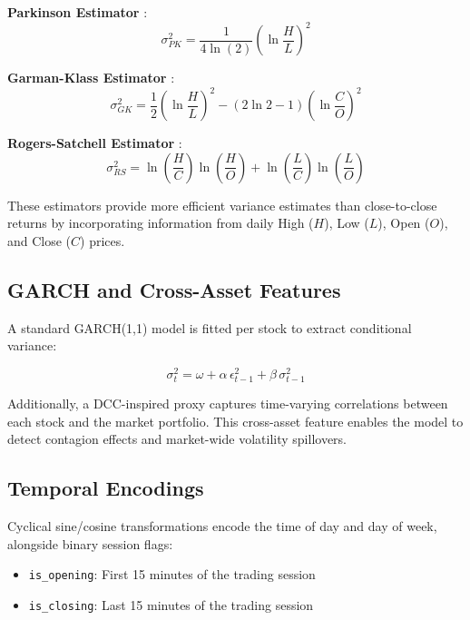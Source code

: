 \textbf{Parkinson Estimator} \cite{parkinson1980}:
\begin{equation}
\sigma_{PK}^2 = \frac{1}{4\ln(2)} \left( \ln\frac{H}{L} \right)^2
\end{equation}

\textbf{Garman-Klass Estimator} \cite{garman1980}:
\begin{equation}
\sigma_{GK}^2 = \frac{1}{2} \left( \ln\frac{H}{L} \right)^2 - (2\ln 2 - 1) \left( \ln\frac{C}{O} \right)^2
\end{equation}

\textbf{Rogers-Satchell Estimator} \cite{rogers1991}:
\begin{equation}
\sigma_{RS}^2 = \ln\!\left(\frac{H}{C}\right) \ln\!\left(\frac{H}{O}\right) + \ln\!\left(\frac{L}{C}\right) \ln\!\left(\frac{L}{O}\right)
\end{equation}

These estimators provide more efficient variance estimates than close-to-close returns by incorporating information from daily High ($H$), Low ($L$), Open ($O$), and Close ($C$) prices.

\subsection{GARCH and Cross-Asset Features}

A standard GARCH(1,1) model \cite{bollerslev1986} is fitted per stock to extract conditional variance:

\begin{equation}
\sigma_t^2 = \omega + \alpha\, \epsilon_{t-1}^2 + \beta\, \sigma_{t-1}^2
\end{equation}

Additionally, a DCC-inspired proxy captures time-varying correlations between each stock and the market portfolio. This cross-asset feature enables the model to detect contagion effects and market-wide volatility spillovers.

\subsection{Temporal Encodings}

Cyclical sine/cosine transformations encode the time of day and day of week, alongside binary session flags:
\begin{itemize}
    \item \texttt{is\_opening}: First 15 minutes of the trading session
    \item \texttt{is\_closing}: Last 15 minutes of the trading session
\end{itemize}

